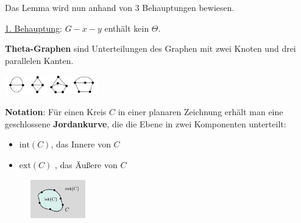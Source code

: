 Das Lemma wird nun anhand von 3 Behauptungen bewiesen.

\underline{1. Behauptung}: $G-x-y$ enthält kein $\Theta$.

\textbf{Theta-Graphen} sind Unterteilungen des Graphen mit zwei Knoten und drei parallelen Kanten.
\begin{center}
	\includegraphics[width=0.3\textwidth]{images/theta.png}
\end{center}
\pagebreak


\textbf{Notation}: Für einen Kreis $C$ in einer planaren Zeichnung erhält man eine geschlossene \textbf{Jordankurve}, die die Ebene in zwei Komponenten unterteilt:
\begin{itemize}
	\item $\text{int}(C)$, das Innere von $C$
	\item $\text{ext}(C)$ , das Äußere von $C$
\end{itemize}
\begin{figure}
	\centering
	\vspace{-70pt}
	\includegraphics[width=0.22\textwidth]{images/jordan.png}
	\vspace{40pt}
	\vspace{-60pt}
\end{figure}

